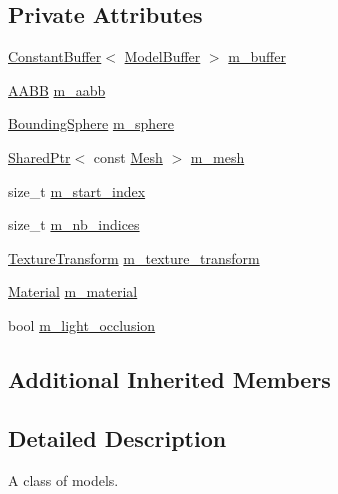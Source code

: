\subsection*{Private Attributes}
\begin{DoxyCompactItemize}
\item 
\hyperlink{classmage_1_1rendering_1_1_constant_buffer}{Constant\+Buffer}$<$ \hyperlink{structmage_1_1rendering_1_1_model_buffer}{Model\+Buffer} $>$ \hyperlink{classmage_1_1rendering_1_1_model_a82132035b4631143bed489c4bc190f95}{m\+\_\+buffer}
\item 
\hyperlink{classmage_1_1_a_a_b_b}{A\+A\+BB} \hyperlink{classmage_1_1rendering_1_1_model_a7b3bb86ad718ba3dae2b1c6042fdeaec}{m\+\_\+aabb}
\item 
\hyperlink{classmage_1_1_bounding_sphere}{Bounding\+Sphere} \hyperlink{classmage_1_1rendering_1_1_model_a88220cb828f0df79489c512245560616}{m\+\_\+sphere}
\item 
\hyperlink{namespacemage_a1e01ae66713838a7a67d30e44c67703e}{Shared\+Ptr}$<$ const \hyperlink{classmage_1_1rendering_1_1_mesh}{Mesh} $>$ \hyperlink{classmage_1_1rendering_1_1_model_a38be646490affe6bd2f2f2bb61d04caa}{m\+\_\+mesh}
\item 
size\+\_\+t \hyperlink{classmage_1_1rendering_1_1_model_a6144f71f0f1d539f5664b07088859751}{m\+\_\+start\+\_\+index}
\item 
size\+\_\+t \hyperlink{classmage_1_1rendering_1_1_model_abc3536c8511523e459fd245ef3c487f2}{m\+\_\+nb\+\_\+indices}
\item 
\hyperlink{classmage_1_1_texture_transform}{Texture\+Transform} \hyperlink{classmage_1_1rendering_1_1_model_a00ad04fc770af700b97f69c83dc01d70}{m\+\_\+texture\+\_\+transform}
\item 
\hyperlink{classmage_1_1rendering_1_1_material}{Material} \hyperlink{classmage_1_1rendering_1_1_model_a933d2f661f511908e7c1e9030cfc777d}{m\+\_\+material}
\item 
bool \hyperlink{classmage_1_1rendering_1_1_model_a796fd0c51ea194826dde990b10e70856}{m\+\_\+light\+\_\+occlusion}
\end{DoxyCompactItemize}
\subsection*{Additional Inherited Members}


\subsection{Detailed Description}
A class of models. 

